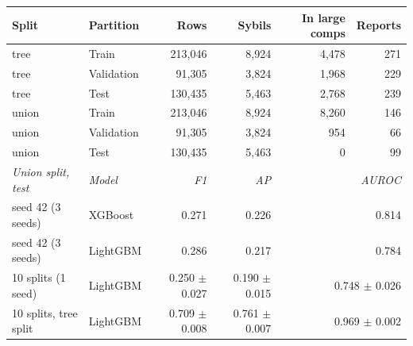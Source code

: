 \begin{tabular}{llrrrr}
\toprule
Split & Partition & Rows & Sybils & In large comps & Reports \\
\midrule
tree & Train & 213,046 & 8,924 & 4,478 & 271 \\
tree & Validation & 91,305 & 3,824 & 1,968 & 229 \\
tree & Test & 130,435 & 5,463 & 2,768 & 239 \\
union & Train & 213,046 & 8,924 & 8,260 & 146 \\
union & Validation & 91,305 & 3,824 & 954 & 66 \\
union & Test & 130,435 & 5,463 & 0 & 99 \\
\midrule
\emph{Union split, test} & \emph{Model} & \emph{F1} & \emph{AP} & \multicolumn{2}{r}{\emph{AUROC}} \\
seed 42 (3 seeds) & XGBoost & 0.271 & 0.226 & \multicolumn{2}{r}{0.814} \\
seed 42 (3 seeds) & LightGBM & 0.286 & 0.217 & \multicolumn{2}{r}{0.784} \\
10 splits (1 seed) & LightGBM & 0.250 $\pm$ 0.027 & 0.190 $\pm$ 0.015 & \multicolumn{2}{r}{0.748 $\pm$ 0.026} \\
10 splits, tree split & LightGBM & 0.709 $\pm$ 0.008 & 0.761 $\pm$ 0.007 & \multicolumn{2}{r}{0.969 $\pm$ 0.002} \\
\bottomrule
\end{tabular}
